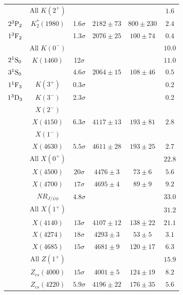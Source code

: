 \begin{table}[tbph]
\begin{center}
\begin{tabular}{cccccc}
& All $K(2^+)$ &  & & & $1.6$\\
$2{}^{3}{\rm P}_{2}$  &  $K^*_2(1980)$  & 1.6$\sigma$    & $2182\pm73$ & $800\pm230$    & $2.4$ \\
$1{}^{3}{\rm F}_{2}$  &       &      1.3$\sigma$  &   $2076\pm25$ & $100\pm74$        & $0.4$  \\
\hline 
& All $K(0^-)$& & & & $10.0$\\
$2{}^{1}{\rm S}_{0}$  &  $K(1460)$    & 12$\sigma$      &    &                        & $11.0$    \\  
$3{}^{1}{\rm S}_{0}$  &               & 4.6$\sigma$      &$2064\pm15$  & $108\pm46$ & $0.5$ \\
\hline 
$1{}^{1}{\rm F}_{3}$  &  $K(3^+)$     &0.3$\sigma$       &   &    & 0.2 \\
\hline 
$1{}^{3}{\rm D}_{3}$  &  $K(3^-)$     &2.3$\sigma$       &  &   & 0.2 \\

\hline 
\hline
&$X(2^-)$ & & & &   \\
  &$X(4150)$ & $6.3\sigma$ & $4117\pm 13$ & $193\pm81$ & $2.8$ \\
\hline
&$X(1^-)$ & & & &   \\
  &$X(4630)$ & $5.5\sigma$ & $4611\pm 28$ & $193\pm25$ & $2.7$ \\
\hline

 &All $X(0^+)$ & & & & $22.8$  \\
 &$X(4500)$ & $20\sigma$ & $4476\pm 3$ & $73\pm6$ &  $5.6$ \\
 &$X(4700)$ & $17\sigma$ & $4695\pm 4$ & $89\pm9$ & $9.2$ \\
 &$NR_{J/\psi \phi}$ & $4.8 \sigma $& & &$33.0$ \\
\hline
 &All $X(1^+)$ & & & & $31.2$ \\
 &$X(4140)$ & $13\sigma$ & $4107\pm 12$ & $138\pm22$ & $21.1$ \\
 &$X(4274)$ & $18\sigma$ & $4293\pm 3$ & $53\pm5$   & $3.1$ \\
 &$X(4685)$ & $15\sigma$ & $4681\pm 9$ & $120\pm17$ & $6.3$ \\
\hline\hline
&All $Z(1^+)$ & & & & $15.9$ \\
  &$Z_{cs}(4000)$ & $15\sigma$ & $4001\pm 5$ & $124\pm19$ & $8.2$ \\
  &$Z_{cs}(4220)$ & $5.9\sigma$ & $4196\pm 22$ & $176\pm35$ & $5.6$ \\
\hline
\end{tabular}
\end{center}
\end{table}



